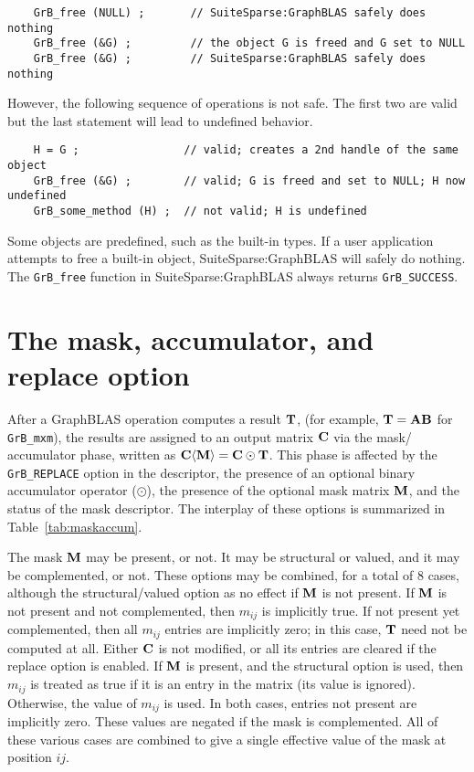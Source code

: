 \documentclass[12pt]{article}
\begin{document}
    {\footnotesize
    \begin{verbatim}
    GrB_free (NULL) ;       // SuiteSparse:GraphBLAS safely does nothing
    GrB_free (&G) ;         // the object G is freed and G set to NULL
    GrB_free (&G) ;         // SuiteSparse:GraphBLAS safely does nothing \end{verbatim} }

\noindent
However, the following sequence of operations is not safe.  The first two are
valid but the last statement will lead to undefined behavior.

    {\footnotesize
    \begin{verbatim}
    H = G ;                // valid; creates a 2nd handle of the same object
    GrB_free (&G) ;        // valid; G is freed and set to NULL; H now undefined
    GrB_some_method (H) ;  // not valid; H is undefined \end{verbatim}}

Some objects are predefined, such as the built-in types.  If a user application
attempts to free a built-in object, SuiteSparse:GraphBLAS will safely do
nothing.  The \verb'GrB_free' function in SuiteSparse:GraphBLAS always
returns \verb'GrB_SUCCESS'.

\newpage
\section{The mask, accumulator, and replace option} %
\label{sec:maskaccum}

After a GraphBLAS operation computes a result ${\bf T}$, (for example, ${\bf
T=AB}$ for \verb'GrB_mxm'), the results are assigned to an output matrix ${\bf
C}$ via the mask/ accumulator phase, written as ${\bf C \langle M \rangle = C
\odot T}$.  This phase is affected by the \verb'GrB_REPLACE' option in the
descriptor, the presence of an optional binary accumulator operator ($\odot$),
the presence of the optional mask matrix ${\bf M}$, and the status of the mask
descriptor.  The interplay of these options is summarized in
Table~\ref{tab:maskaccum}.

The mask ${\bf M}$ may be present, or not.  It may be structural or valued, and
it may be complemented, or not.  These options may be combined, for a total of
8 cases, although the structural/valued option as no effect if ${\bf M}$ is not
present.  If ${\bf M}$ is not present and not complemented, then $m_{ij}$ is
implicitly true.  If not present yet complemented, then all $m_{ij}$ entries are
implicitly zero; in this case, ${\bf T}$ need not be computed at all.  Either
${\bf C}$ is not modified, or all its entries are cleared if the replace option
is enabled.  If ${\bf M}$ is present, and the structural option is used, then
$m_{ij}$ is treated as true if it is an entry in the matrix (its value is
ignored).  Otherwise, the value of $m_{ij}$ is used.  In both cases, entries
not present are implicitly zero.  These values are negated if the mask is
complemented.  All of these various cases are combined to give a single
effective value of the mask at position ${ij}$.
\end{document}
